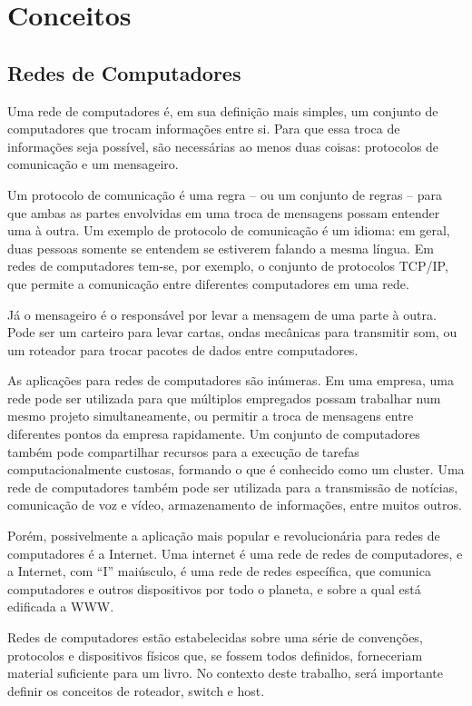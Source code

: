 \chapter{Conceitos}
\label{ch:intro}

\section{Redes de Computadores}
\label{ch:redes}

	Uma rede de computadores é, em sua definição mais simples, um conjunto de computadores que trocam informações entre si. Para que essa troca de informações seja possível, são necessárias ao menos duas coisas: protocolos de comunicação e um mensageiro.

	Um protocolo de comunicação é uma regra – ou um conjunto de regras – para que ambas as partes envolvidas em uma troca de mensagens possam entender uma à outra. Um exemplo de protocolo de comunicação é um idioma: em geral, duas pessoas somente se entendem se estiverem falando a mesma língua. Em redes de computadores tem-se, por exemplo, o conjunto de protocolos TCP/IP, que permite a comunicação entre diferentes computadores em uma rede.

	Já o mensageiro é o responsável por levar a mensagem de uma parte à outra. Pode ser um carteiro para levar cartas, ondas mecânicas para transmitir som, ou um roteador para trocar pacotes de dados entre computadores.

	As aplicações para redes de computadores são inúmeras. Em uma empresa, uma rede pode ser utilizada para que múltiplos empregados possam trabalhar num mesmo projeto simultaneamente, ou permitir a troca de mensagens entre diferentes pontos da empresa rapidamente. Um conjunto de computadores também pode compartilhar recursos para a execução de tarefas computacionalmente custosas, formando o que é conhecido como um cluster. Uma rede de computadores também pode ser utilizada para a transmissão de notícias, comunicação de voz e vídeo, armazenamento de informações, entre muitos outros.

	Porém, possivelmente a aplicação mais popular e revolucionária para redes de computadores é a Internet. Uma internet é uma rede de redes de computadores, e a Internet, com “I” maiúsculo, é uma rede de redes específica, que comunica computadores e outros dispositivos por todo o planeta, e sobre a qual está edificada a WWW.
	
	Redes de computadores estão estabelecidas sobre uma série de convenções, protocolos e dispositivos físicos que, se fossem todos definidos, forneceriam material suficiente para um livro. No contexto deste trabalho, será importante definir os conceitos de roteador, switch e host.


